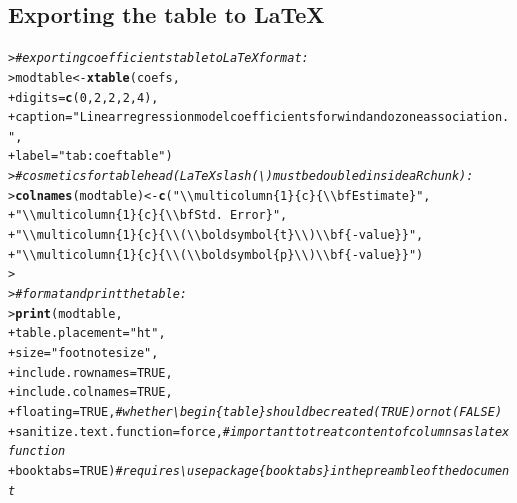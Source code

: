 \documentclass[10pt,a4paper,twoside]{article}\usepackage[]{graphicx}\usepackage[]{xcolor}
\makeatletter
\newcommand{\hlnum}[1]{\textcolor[rgb]{0.686,0.059,0.569}{#1}}%
\newcommand{\hlsng}[1]{\textcolor[rgb]{0.192,0.494,0.8}{#1}}%
\newcommand{\hlcom}[1]{\textcolor[rgb]{0.678,0.584,0.686}{\textit{#1}}}%
\newcommand{\hldef}[1]{\textcolor[rgb]{0.345,0.345,0.345}{#1}}%
\newcommand{\hlkwb}[1]{\textcolor[rgb]{0.69,0.353,0.396}{#1}}%
\newcommand{\hlkwc}[1]{\textcolor[rgb]{0.333,0.667,0.333}{#1}}%
\newcommand{\hlkwd}[1]{\textcolor[rgb]{0.737,0.353,0.396}{\textbf{#1}}}%
\newenvironment{kframe}{%
 \def\at@end@of@kframe{}%
 \ifinner\ifhmode%
  \def\at@end@of@kframe{\end{minipage}}%
  \begin{minipage}{\columnwidth}%
 \fi\fi%
 \def\FrameCommand##1{\hskip\@totalleftmargin \hskip-\fboxsep
 \colorbox{shadecolor}{##1}\hskip-\fboxsep
     \hskip-\linewidth \hskip-\@totalleftmargin \hskip\columnwidth}%
 \MakeFramed {\advance\hsize-\width
   \@totalleftmargin\z@ \linewidth\hsize
   \@setminipage}}%
 {\par\unskip\endMakeFramed%
 \at@end@of@kframe}
\newenvironment{knitrout}{}{} %
\makeatother
\begin{document}
  
\subsection{Exporting the table to \LaTeX}
\label{app:table}
\begin{knitrout}\footnotesize
{}\color{fgcolor}\begin{kframe}
\begin{alltt}
\hldef{> }\hlcom{# exporting coefficients table to LaTeX format:}
\hldef{> }\hldef{modtable} \hlkwb{<-} \hlkwd{xtable}\hldef{(coefs,}
\hldef{+ }                   \hlkwc{digits} \hldef{=} \hlkwd{c}\hldef{(}\hlnum{0}\hldef{,} \hlnum{2}\hldef{,} \hlnum{2}\hldef{,} \hlnum{2}\hldef{,} \hlnum{4}\hldef{),}
\hldef{+ }                   \hlkwc{caption} \hldef{=} \hlsng{"Linear regression model coefficients for wind and ozone association."}\hldef{,}
\hldef{+ }                   \hlkwc{label} \hldef{=} \hlsng{"tab:coeftable"}\hldef{)}
\hldef{> }\hlcom{# cosmetics for table head (LaTeX slash (\textbackslash{}) must be doubled inside a R chunk):}
\hldef{> }\hlkwd{colnames}\hldef{(modtable)} \hlkwb{<-} \hlkwd{c}\hldef{(}\hlsng{"\textbackslash{}\textbackslash{}multicolumn\{1\}\{c\}\{\textbackslash{}\textbackslash{}bf Estimate\}"}\hldef{,}
\hldef{+ }                        \hlsng{"\textbackslash{}\textbackslash{}multicolumn\{1\}\{c\}\{\textbackslash{}\textbackslash{}bf Std.~Error\}"}\hldef{,}
\hldef{+ }                        \hlsng{"\textbackslash{}\textbackslash{}multicolumn\{1\}\{c\}\{\textbackslash{}\textbackslash{}(\textbackslash{}\textbackslash{}boldsymbol\{t\}\textbackslash{}\textbackslash{})\textbackslash{}\textbackslash{}bf\{-value\}\}"}\hldef{,}
\hldef{+ }                        \hlsng{"\textbackslash{}\textbackslash{}multicolumn\{1\}\{c\}\{\textbackslash{}\textbackslash{}(\textbackslash{}\textbackslash{}boldsymbol\{p\}\textbackslash{}\textbackslash{})\textbackslash{}\textbackslash{}bf\{-value\}\}"}\hldef{)}
\hldef{> }
\hldef{> }\hlcom{# format and print the table:}
\hldef{> }\hlkwd{print}\hldef{(modtable,}
\hldef{+ }      \hlkwc{table.placement} \hldef{=} \hlsng{"ht"}\hldef{,}
\hldef{+ }      \hlkwc{size} \hldef{=} \hlsng{"footnotesize"}\hldef{,}
\hldef{+ }      \hlkwc{include.rownames} \hldef{=} \hlnum{TRUE}\hldef{,}
\hldef{+ }      \hlkwc{include.colnames} \hldef{=} \hlnum{TRUE}\hldef{,}
\hldef{+ }      \hlkwc{floating} \hldef{=} \hlnum{TRUE}\hldef{,}                 \hlcom{# whether \textbackslash{}begin\{table\} should be created (TRUE) or not (FALSE)}
\hldef{+ }      \hlkwc{sanitize.text.function} \hldef{= force,}  \hlcom{# important to treat content of columns as latex function}
\hldef{+ }      \hlkwc{booktabs} \hldef{=} \hlnum{TRUE}\hldef{)}                 \hlcom{# requires \textbackslash{}usepackage\{booktabs\} in the preamble of the document}
\end{alltt}
\end{kframe}
\end{knitrout}
  
\end{document}
